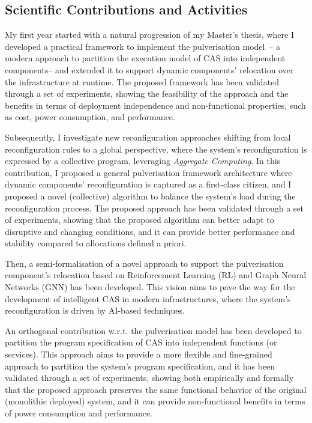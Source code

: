 \documentclass[runningheads]{llncs}
\begin{document}
\subsection{Scientific Contributions and Activities}

My first year started with a natural progression of my Master's thesis,
where I developed a practical framework to implement the pulverisation model~\cite{DBLP:journals/fi/CasadeiPPVW20,DBLP:journals/iotj/CasadeiFPPSV22}--
a modern approach to partition the execution model of CAS into independent components--
and extended it to support dynamic components' relocation over the infrastructure at runtime.
%
The proposed framework has been validated through a set of experiments,
showing the feasibility of the approach and the benefits in terms of deployment independence and non-functional properties,
such as cost,
power consumption,
and performance.

Subsequently,
I investigate new reconfiguration approaches shifting from local reconfiguration rules to a global perspective,
where the system's reconfiguration is expressed by a collective program,
leveraging \emph{Aggregate Computing}.
%
In this contribution,
I proposed a general pulverisation framework architecture where dynamic components' reconfiguration is captured as a first-class citizen,
and I proposed a novel (collective) algorithm to balance the system's load during the reconfiguration process.
%
The proposed approach has been validated through a set of experiments,
showing that the proposed algorithm can better adapt to disruptive and changing conditions,
and it can provide better performance and stability compared to allocations defined a priori.

Then,
a semi-formalisation of a novel approach to support the pulverisation component's relocation based on Reinforcement Learning (RL) and Graph Neural Networks (GNN) has been developed.
%
This vision aims to pave the way for the development of intelligent CAS in modern infrastructures,
where the system's reconfiguration is driven by AI-based techniques.

An orthogonal contribution w.r.t. the pulverisation model has been developed to partition the program specification of CAS into independent functions (or services).
%
This approach aims to provide a more flexible and fine-grained approach to partition the system's program specification,
and it has been validated through a set of experiments,
showing both empirically and formally that the proposed approach preserves the same functional behavior of the original (monolithic deployed) system,
and it can provide non-functional benefits in terms of power consumption and performance.
\end{document}
